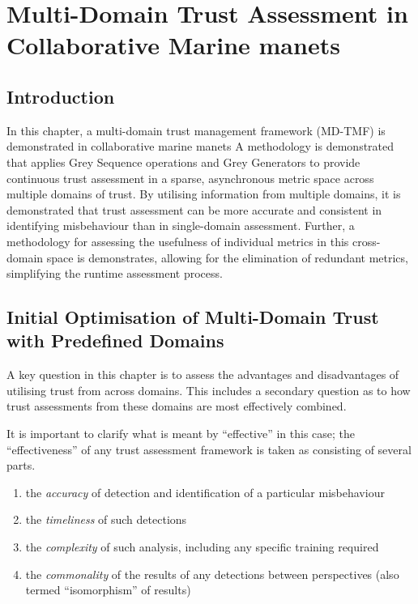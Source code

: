 \def\ChapterTitle{Multi-Domain Trust Assessment in Collaborative Marine \gls{manet}s}

\chapter{\ChapterTitle}
\label{Chapter\thechapter}

\section{Introduction}

In this chapter, a multi-domain trust management framework (MD-TMF) is demonstrated in collaborative marine \glspl{manet}
A methodology is demonstrated that applies Grey Sequence operations and Grey Generators to provide continuous trust assessment in a sparse, asynchronous metric space across multiple domains of trust.
By utilising information from multiple domains, it is demonstrated that trust assessment can be more accurate and consistent in identifying misbehaviour than in single-domain assessment.
Further, a methodology for assessing the usefulness of individual metrics in this cross-domain space is demonstrates, allowing for the elimination of redundant metrics, simplifying the runtime assessment process.

\section{Initial Optimisation of Multi-Domain Trust with Predefined Domains}

A key question in this chapter is to assess the advantages and disadvantages of utilising trust from across domains. 
This includes a secondary question as to how trust assessments from these domains are most effectively combined. 

It is important to clarify what is meant by ``effective'' in this case; the ``effectiveness'' of any trust assessment framework is taken as consisting of several parts.

\begin{enumerate}
  \item the \emph{accuracy} of detection and identification of a particular misbehaviour
  \item the \emph{timeliness} of such detections
  \item the \emph{complexity} of such analysis, including any specific training required
  \item the \emph{commonality} of the results of any detections between perspectives (also termed ``isomorphism'' of results)
\end{enumerate}



